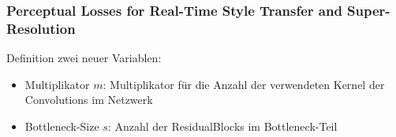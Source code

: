 \begin{frame}
    \frametitle{Perceptual Losses for Real-Time Style Transfer and Super-Resolution \cite{DBLP:journals/corr/JohnsonAL16}}

    Definition  zwei neuer Variablen:

    \begin{itemize}
        \item Multiplikator $ m $: Multiplikator für die Anzahl der verwendeten Kernel der Convolutions im Netzwerk
        \item Bottleneck-Size $ s $: Anzahl der ResidualBlocks im Bottleneck-Teil
    \end{itemize}
\end{frame}



